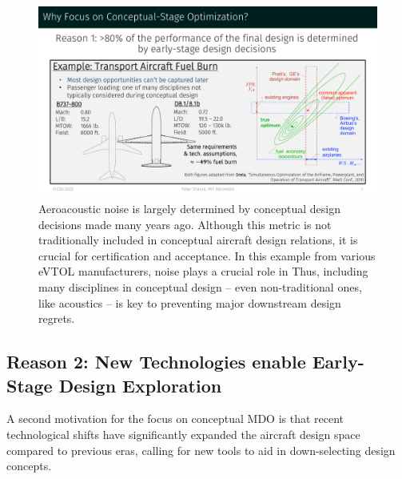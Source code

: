 \documentclass[12pt,vi,oneside]{report}
\begin{document}
    \begin{figure}[h]
        \centering
        \includegraphics[page=2,trim=1cm 1.3cm 1cm 5cm, clip, width=\textwidth]{../figures/motivation_for_conceptual_MDO_focus.pdf}
        \caption{Aeroacoustic noise is largely determined by conceptual design decisions made many years ago. Although this metric is not traditionally included in conceptual aircraft design relations, it is crucial for certification and acceptance. In this example from various eVTOL manufacturers, noise plays a crucial role in Thus, including many disciplines in conceptual design -- even non-traditional ones, like acoustics -- is key to preventing major downstream design regrets.}
        \label{fig:motivation_1b}
    \end{figure}

    \afterpage{\FloatBarrier}

    \subsection*{Reason 2: New Technologies enable Early-Stage Design Exploration}

    A second motivation for the focus on conceptual MDO is that recent technological shifts have significantly expanded the aircraft design space compared to previous eras, calling for new tools to aid in down-selecting design concepts.
\end{document}
